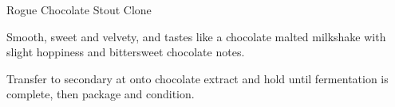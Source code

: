 \begin{recipe}{Rogue Chocolate Stout Clone}

\begin{aboutblock}
Smooth, sweet and velvety, and tastes like a chocolate malted milkshake with
slight hoppiness and bittersweet chocolate notes. 
\end{aboutblock}


\begin{methodandtiming}
 
\begin{mashsteps}
\end{mashsteps}

\begin{fermentationsteps}
\end{fermentationsteps}

\begin{directions}
Transfer to secondary at  onto chocolate extract and hold until
fermentation is complete, then package and condition.
\end{directions}

\end{methodandtiming}

\recipebreak

\begin{ingredientsblock}

\begin{malts}
\end{malts}

\begin{hops}
\end{hops}


\begin{twists}
\end{twists}

\end{ingredientsblock}

\end{recipe}

